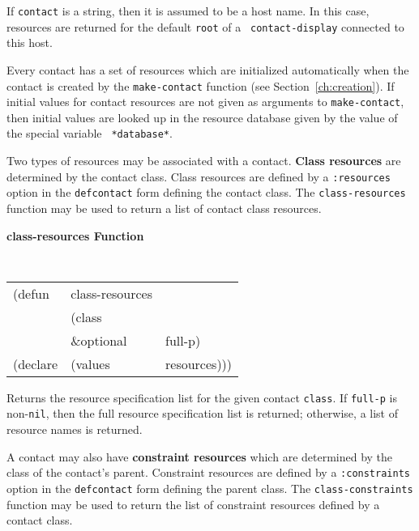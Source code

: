 \documentclass[twoside]{book}
\begin{document}
\begin{sloppy}
\begin{flushright}
{If {\tt contact} is a string, then it is assumed to be a host name. In this
case, resources are returned for the default {\tt root} of a {\tt
contact-display} connected to this host.

}\end{flushright}



Every contact has a set of resources which are initialized automatically
when the contact is created by the {\tt make-contact} function (see
Section~\ref{ch:creation}).
If initial values for contact resources are not given as arguments to
{\tt make-contact}, then initial values are looked up in the resource
database given by the value of the special variable {\tt
*database*}.

Two types of resources may be associated with a contact. {\bf Class
resources} are determined by the contact class. Class resources are
defined by a {\tt :resources} option in the {\tt defcontact} form
defining the contact class.
The {\tt class-resources} function may be used to return a list of
contact class resources.

{\samepage
{\large {\bf class-resources \hfill Function}} 
\begin{flushright} \parbox[t]{6.125in}{
\tt
\begin{tabular}{lll}
\raggedright
(defun & class-resources & \\ 
& (class\\
& \&optional & full-p) \\
(declare &(values  & resources)))
\end{tabular}
\rm

}\end{flushright}}

\begin{flushright} \parbox[t]{6.125in}{
Returns the resource specification list for the given contact {\tt class}. If
{\tt full-p} is non-{\tt nil}, then the full resource specification list is
returned; otherwise, a list of resource names is returned.

}\end{flushright}

A contact may also have {\bf constraint
resources} which are determined by the class
of the contact's parent. Constraint resources are
defined by a {\tt :constraints} option in the {\tt defcontact} form
defining the parent class.
The {\tt class-constraints} function may be used to return the list of
constraint resources defined by a contact class.


\end{sloppy}
\end{document}
